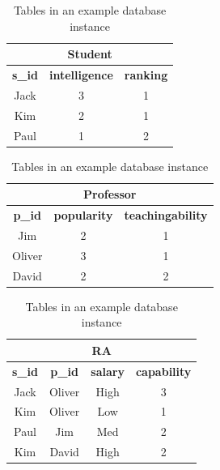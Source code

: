 \begin{table}[htbp]
  \centering
  \caption{Tables in an example database instance}
    \begin{tabular}{|c|c|c|}
    \multicolumn{3}{c}{\textbf{ Student}} \\ \hline
    \textbf{s\_id} & \textbf{intelligence} & \textbf{ranking} \\  \hline

    {Jack} & {3} & {1} \\  \hline

    {Kim} & {2} & {1} \\  \hline

    {Paul} & {1} & {2} \\  \hline

    \end{tabular}%
    
      \begin{tabular}{|c|c|c|}

    \multicolumn{3}{c}{\textbf{ Professor}} \\  \hline

    \textbf{p\_id} & \textbf{popularity} & \textbf{teachingability} \\  \hline

    {Jim} & {2} & {1} \\  \hline

    {Oliver} & {3} & {1} \\  \hline
 
    {David} & {2} & {2} \\  \hline

    \end{tabular}%

    \begin{tabular}{|c|c|c|c|}

    \multicolumn{4}{c}{\textbf{ RA }} \\ \hline

    \textbf{s\_id} & \textbf{p\_id} & \textbf{salary} & \textbf{capability} \\ \hline

    {Jack} & {Oliver} & {High} & {3} \\ \hline

    {Kim} & {Oliver} & {Low} & {1} \\ \hline

    {Paul} & {Jim} & {Med} & {2} \\ \hline

    {Kim} & {David} & {High} & {2} \\ \hline

    \end{tabular}%

  \label{tab:instances}%
\end{table}%


